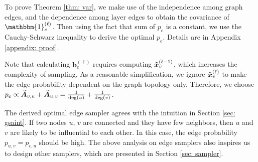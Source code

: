 To prove Theorem \ref{thm: var}, we make use of the independence among graph edges, and the dependence among layer edges to obtain the covariance of $\mathbbm{1}_e^{\paren{\ell}}$. Then using the fact that sum of $p_e$ is a constant, we use the Cauchy-Schwarz inequality to derive the optimal $p_e$. Details are in Appendix \ref{appendix: proof}. 


Note that calculating $\bm{b}_e^{(\ell)}$ requires computing $\Tilde{\bm{x}}_v^{\left( \ell - 1 \right)}$, which increases the complexity of sampling. As a reasonable simplification, we ignore $\Tilde{\bm{x}}_v^{\left( \ell \right)}$ to make the edge probability dependent on the graph topology only. Therefore, we choose $p_e \propto \Anorm_{v,u} + \Anorm_{u, v}=\frac{1}{\text{deg}\paren{u}}+\frac{1}{\text{deg}\paren{v}}$.

The derived optimal edge sampler agrees with the intuition in Section \ref{sec: gsaint}. If two nodes $u$, $v$ are connected and they have few neighbors, then $u$ and $v$ are likely to be influential to each other. In this case, the edge probability $p_{u,v}=p_{v,u}$ should be high. The above analysis on edge samplers also inspires us to design other samplers, which are presented in Section \ref{sec: sampler}.


